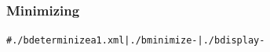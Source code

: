 \begin{center}
\end{center}

\subsubsection{Minimizing}

\begin{alltt}
# ./b determinize a1.xml | ./b minimize - | ./b display -
\end{alltt}

